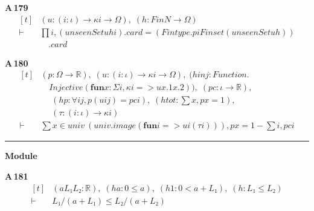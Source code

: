 \noindent\textbf{A\,179}\quad{}
{\footnotesize\[ \begin{aligned}[t]
&(\mathit{u} : (\mathit{i} : \iota ) \to \kappa \mathit{i} \to \Omega ),\; (\mathit{h} : \mathit{Fin} \mathit{N} \to \Omega )\\
\vdash\;&\textstyle\prod \mathit{i}, (\mathit{unseenSet} \mathit{u} \mathit{h} \mathit{i}).\mathit{card} = (\mathit{Fintype}.\mathit{piFinset} (\mathit{unseenSet} \mathit{u} \mathit{h}))\\
&\quad .\mathit{card}
\end{aligned} \]}

\noindent\textbf{A\,180}\quad{}
{\footnotesize\[ \begin{aligned}[t]
&(\mathit{p} : \Omega \to \mathbb{R} ),\; (\mathit{u} : (\mathit{i} : \iota ) \to \kappa \mathit{i} \to \Omega ),\; (\mathit{hinj} : \mathit{Function}.\\
&\quad \mathit{Injective} (\mathbf{fun} \mathit{x} : \Sigma \mathit{i}, \kappa \mathit{i} => \mathit{u} \mathit{x}.1 \mathit{x}.2)),\; (\mathit{pc} : \iota \to \mathbb{R} ),\\
&\quad \; (\mathit{hp} : \forall \mathit{i} \mathit{j}, \mathit{p} (\mathit{u} \mathit{i} \mathit{j}) = \mathit{pc} \mathit{i}),\; (\mathit{htot} : \textstyle\sum \mathit{x}, \mathit{p} \mathit{x} = 1),\\
&\quad \; (\tau : (\mathit{i} : \iota ) \to \kappa \mathit{i})\\
\vdash\;&\textstyle\sum \mathit{x} \in \mathit{univ} \ (\mathit{univ}.\mathit{image} (\mathbf{fun} \mathit{i} => \mathit{u} \mathit{i} (\tau \mathit{i}))), \mathit{p} \mathit{x} = 1 - \textstyle\sum \mathit{i}, \mathit{pc} \mathit{i}
\end{aligned} \]}

\vspace{4pt}\noindent\rule{\columnwidth}{0.4pt}\par\vspace{2pt}
\noindent\textbf{Module }\par\vspace{3pt}

\noindent\textbf{A\,181}\quad{}
{\footnotesize\[ \begin{aligned}[t]
&(\mathit{a} \mathit{L₁} \mathit{L₂} : \mathbb{R} ),\; (\mathit{ha} : 0 \leq \mathit{a}),\; (\mathit{h1} : 0 < \mathit{a} + \mathit{L₁}),\; (\mathit{h} : \mathit{L₁} \leq \mathit{L₂})\\
\vdash\;&\mathit{L₁}/(\mathit{a} + \mathit{L₁}) \leq \mathit{L₂}/(\mathit{a} + \mathit{L₂})
\end{aligned} \]}

